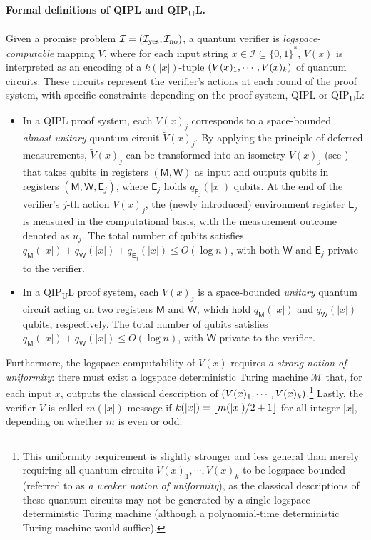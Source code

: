 \documentclass[10pt,a4paper]{article}
\numberwithin{equation}{section}
\numberwithin{figure}{section}
\newcommand{\QIPL}{\textnormal{\textsf{QIPL}}\xspace}
\newcommand{\QIPUL}{\texorpdfstring{\textnormal{\textsf{QIP}\textsubscript{\textnormal{U}}\textsf{L}}}\xspace}
\DeclarePairedDelimiter\rbra{\lparen}{\rparen}
\DeclarePairedDelimiter\floor{\lfloor}{\rfloor}
\newcommand{\yes}{{\rm yes}}
\newcommand{\no}{{\rm no}}
\newcommand{\binset}{\{0,1\}}
\newcommand{\calI}{\mathcal{I}}
\newcommand{\calM}{\mathcal{M}}
\newcommand{\sfE}{\mathsf{E}}
\newcommand{\sfM}{\mathsf{M}}
\newcommand{\sfW}{\mathsf{W}}
\begin{document}
\paragraph{Formal definitions of \QIPL{} and \QIPUL{}.} Given a promise problem $\calI = (\calI_{\yes}, \calI_{\no})$, a quantum verifier is \textit{logspace-computable} mapping $V$, where for each input string $x \in \calI \subseteq \binset^*$, $V(x)$ is interpreted as an encoding of a $k(|x|)$-tuple $\rbra*{V(x)_1,\cdots,V(x)_k}$ of quantum circuits. These circuits represent the verifier's actions at each round of the proof system, with specific constraints depending on the proof system, \QIPL{} or \QIPUL{}: 
\begin{itemize}[leftmargin=2em, topsep=0.33em, itemsep=0.33em, parsep=0.33em]
    \item In a \QIPL{} proof system, each $V(x)_j$ corresponds to a space-bounded \textit{almost-unitary} quantum circuit $\widetilde{V}(x)_j$. By applying the principle of deferred measurements, $\widetilde{V}(x)_j$ can be transformed into an isometry $V(x)_j$ (see ) that takes qubits in registers $(\sfM,\sfW)$ as input and outputs qubits in registers $(\sfM,\sfW,\sfE_j)$, where $\sfE_j$ holds $q_{\sfE_j}(|x|)$ qubits.
    At the end of the verifier's $j$-th action $V(x)_j$, the (newly introduced) environment register $\sfE_j$ is measured in the computational basis, with the measurement outcome denoted as $u_j$. 
    The total number of qubits satisfies $q_{\sfM}(|x|) + q_{\sfW}(|x|) + q_{\sfE_j}(|x|) \leq O(\log n)$, with both $\sfW$ and $\sfE_j$ private to the verifier. 
    \item In a \QIPUL{} proof system, each $V(x)_j$ is a space-bounded \textit{unitary} quantum circuit acting on two registers $\sfM$ and $\sfW$, which hold $q_{\sfM}(|x|)$ and $q_{\sfW}(|x|)$ qubits, respectively. The total number of qubits satisfies $q_{\sfM}(|x|) + q_{\sfW}(|x|) \leq O(\log n)$, with $\sfW$ private to the verifier. 
\end{itemize}

Furthermore, the logspace-computability of $V(x)$ requires \textit{a strong notion of uniformity}: there must exist a logspace deterministic Turing machine $\calM$ that, for each input $x$, outputs the classical description of $\rbra{V(x)_1,\cdots,V(x)_k}$.\footnote{This uniformity requirement is slightly stronger and less general than merely requiring all quantum circuits $V(x)_1,\cdots,V(x)_k$ to be logspace-bounded (referred to as \textit{a weaker notion of uniformity}), as the classical descriptions of these quantum circuits may not be generated by a single logspace deterministic Turing machine (although a polynomial-time deterministic Turing machine would suffice).\label{footref:logspace-uniformity}} 
Lastly, the verifier $V$ is called $m(|x|)$-message if $k(|x|) = \floor{m(|x|)/2+1}$ for all integer $|x|$, depending on whether $m$ is even or odd. 
\end{document}
